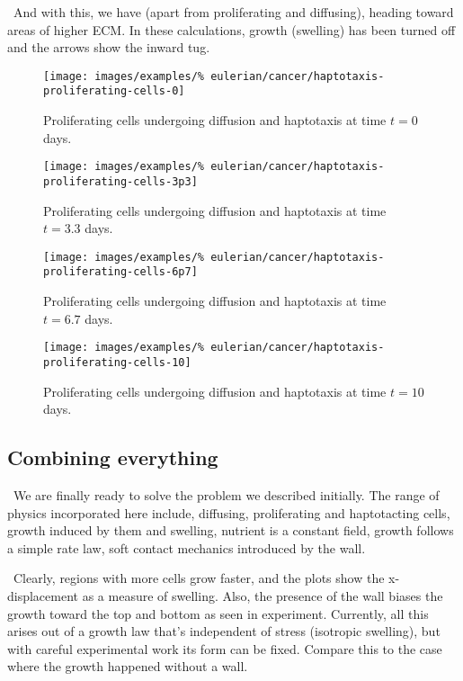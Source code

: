 \textbullet\ And with this, we have (apart from proliferating and
diffusing), heading toward areas of higher ECM. In these calculations,
growth (swelling) has been turned off and the arrows show the inward
tug. 

\begin{figure}[!hptb]
\centering
\texttt{[image: images/examples/\%
eulerian/cancer/haptotaxis-proliferating-cells-0]}
\caption{Proliferating cells undergoing diffusion and haptotaxis at time $t=0$ days.}
\label{tumour-haptotaxis-proliferation-0}
\end{figure}

\begin{figure}[!hptb]
\centering
\texttt{[image: images/examples/\%
eulerian/cancer/haptotaxis-proliferating-cells-3p3]}
\caption{Proliferating cells undergoing diffusion and haptotaxis at time $t=3.3$ days.}
\label{tumour-haptotaxis-proliferation-3p3}
\end{figure}

\begin{figure}[!hptb]
\centering
\texttt{[image: images/examples/\%
eulerian/cancer/haptotaxis-proliferating-cells-6p7]}
\caption{Proliferating cells undergoing diffusion and haptotaxis at time $t=6.7$ days.}
\label{tumour-haptotaxis-proliferation-6p7}
\end{figure}

\begin{figure}[!hptb]
\centering
\texttt{[image: images/examples/\%
eulerian/cancer/haptotaxis-proliferating-cells-10]}
\caption{Proliferating cells undergoing diffusion and haptotaxis at time $t=10$ days.}
\label{tumour-haptotaxis-proliferation-10}
\end{figure}

\clearpage

\subsection{Combining everything}
\label{cacophonous-medley}

\textbullet\ We are finally ready to solve the problem we described
initially. The range of physics incorporated here include, diffusing,
proliferating and haptotacting cells, growth induced by them and
swelling, nutrient is a constant field, growth follows a simple rate
law, soft contact mechanics introduced by the wall.

\textbullet\ Clearly, regions with more cells grow faster, and the
plots show the x-displacement as a measure of swelling. Also, the
presence of the wall biases the growth toward the top and bottom as
seen in experiment. Currently, all this arises out of a growth law
that's independent of stress (isotropic swelling), but with careful
experimental work its form can be fixed. Compare this to the case
where the growth happened without a wall.


